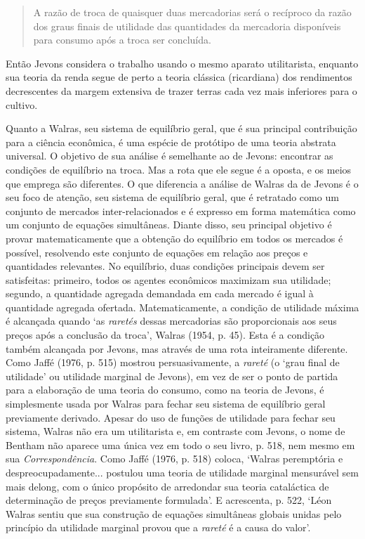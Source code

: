 \documentclass[12pt]{article}
\begin{document}
\begin{quote}
A razão de troca de quaisquer duas mercadorias será o recíproco da razão dos graus finais de utilidade das quantidades da mercadoria disponíveis para consumo após a troca ser concluída.
\end{quote}

Então Jevons considera o trabalho usando o mesmo aparato utilitarista, enquanto sua teoria da renda segue de perto a teoria clássica (ricardiana) dos rendimentos decrescentes da margem extensiva de trazer terras cada vez mais inferiores para o cultivo.

Quanto a Walras, seu sistema de equilíbrio geral, que é sua principal contribuição para a ciência econômica, é uma espécie de protótipo de uma teoria abstrata universal. O objetivo de sua análise é semelhante ao de Jevons: encontrar as condições de equilíbrio na troca. Mas a rota que ele segue é a oposta, e os meios que emprega são diferentes. O que diferencia a análise de Walras da de Jevons é o seu foco de atenção, seu sistema de equilíbrio geral, que é retratado como um conjunto de mercados inter-relacionados e é expresso em forma matemática como um conjunto de equações simultâneas. Diante disso, seu principal objetivo é provar matematicamente que a obtenção do equilíbrio em todos os mercados é possível, resolvendo este conjunto de equações em relação aos preços e quantidades relevantes. No equilíbrio, duas condições principais devem ser satisfeitas: primeiro, todos os agentes econômicos maximizam sua utilidade; segundo, a quantidade agregada demandada em cada mercado é igual à quantidade agregada ofertada. Matematicamente, a condição de utilidade máxima é alcançada quando ‘as \textit{raretés} dessas mercadorias são proporcionais aos seus preços após a conclusão da troca’, Walras (1954, p. 45). Esta é a condição também alcançada por Jevons, mas através de uma rota inteiramente diferente. Como Jaffé (1976, p. 515) mostrou persuasivamente, a \textit{rareté} (o ‘grau final de utilidade’ ou utilidade marginal de Jevons), em vez de ser o ponto de partida para a elaboração de uma teoria do consumo, como na teoria de Jevons, é simplesmente usada por Walras para fechar seu sistema de equilíbrio geral previamente derivado. Apesar do uso de funções de utilidade para fechar seu sistema, Walras não era um utilitarista e, em contraste com Jevons, o nome de Bentham não aparece uma única vez em todo o seu livro, p. 518, nem mesmo em sua \textit{Correspondência}. Como Jaffé (1976, p. 518) coloca, ‘Walras peremptória e despreocupadamente... postulou uma teoria de utilidade marginal mensurável sem mais delong, com o único propósito de arredondar sua teoria cataláctica de determinação de preços previamente formulada’. E acrescenta, p. 522, ‘Léon Walras sentiu que sua construção de equações simultâneas globais unidas pelo princípio da utilidade marginal provou que a \textit{rareté} é a causa do valor’.
\end{document}
